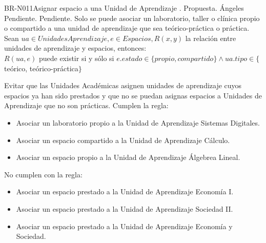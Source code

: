 \begin{BusinessRule}{BR-N011}{Asignar espacio a una Unidad de Aprendizaje}
	{\bcCondition}    %
	{\btEnabler}     %
	{\blControlling}    %
	.
	\BRItem[Estado] Propuesta.
	 Ángeles
	 Pendiente.
	 Pendiente.
	\BRItem[Descripción] Solo se puede asociar un laboratorio, taller o clínica  propio o compartido a una unidad de aprendizaje que sea teórico-práctica o práctica.
	\BRItem[Sentencia] Sean $ ua \in UnidadesAprendizaje, e \in Espacios, R(x,y) $ la relación entre unidades de aprendizaje y espacios, entonces:\\
		$ R(ua, e) $ puede existir si y sólo si $ e.estado \in \{propio, compartido\} \land ua.tipo \in \{$ teórico, teórico-práctica$\}$

	\BRItem[Motivación] Evitar que las Unidades Académicas asignen unidades de aprendizaje cuyos espacios ya han sido prestados y que no se puedan asignas espacios a Unidades de Aprendizaje que no son prácticas.
	 Cumplen la regla:
		\begin{itemize}
			\item Asociar un laboratorio propio a la Unidad de Aprendizaje Sistemas Digitales.
			\item Asociar un espacio compartido a la Unidad de Aprendizaje Cálculo.
			\item Asociar un espacio propio a la Unidad de Aprendizaje Álgebrea Lineal.
		\end{itemize}
	 No cumplen con la regla:
		\begin{itemize}
			\item Asociar un espacio prestado a la Unidad de Aprendizaje Economía I.
			\item Asociar un espacio prestado a la Unidad de Aprendizaje Sociedad II.
			\item Asociar un espacio prestado a la Unidad de Aprendizaje Economía y Sociedad.
		\end{itemize}
\end{BusinessRule}

